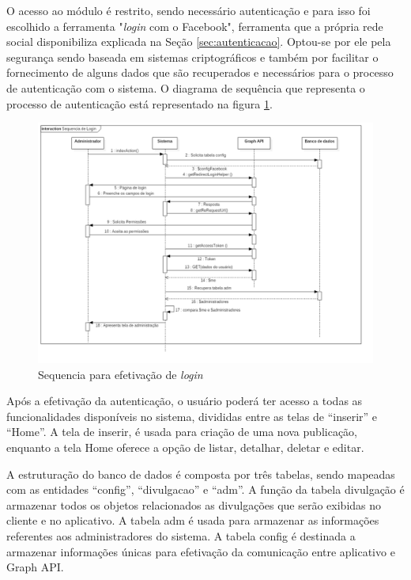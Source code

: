 O acesso ao módulo é restrito, sendo necessário autenticação e para isso foi escolhido a ferramenta "\textit{login} com o Facebook", ferramenta que a própria rede social disponibiliza explicada na Seção \ref{sec:autenticacao}. Optou-se por ele pela segurança sendo baseada em sistemas criptográficos e também por facilitar o fornecimento de alguns dados que são recuperados e necessários para o processo de autenticação com o sistema. O diagrama de sequência que representa o processo de autenticação está representado na figura \ref{fig:sequencialogin}.

\begin{figure}[H]
\centering
\includegraphics[scale=0.4]{figuras/sequencialogin}
\caption{Sequencia para efetivação de \textit{login}}
\label{fig:sequencialogin}
\end{figure}

Após a efetivação da autenticação, o usuário poderá ter acesso a todas as funcionalidades disponíveis no sistema, divididas entre as telas de ``inserir'' e ``Home''. A tela de inserir, é usada para criação de uma nova publicação, enquanto a tela Home oferece a opção de listar, detalhar, deletar e editar.

A estruturação do banco de dados é composta por três tabelas, sendo mapeadas com as entidades ``config'', ``divulgacao'' e ``adm''. A função da tabela divulgação é armazenar todos os objetos relacionados as divulgações que serão exibidas no cliente e no aplicativo. A tabela adm é usada para armazenar as informações referentes aos administradores do sistema. A tabela config é destinada a armazenar informações únicas para efetivação da comunicação entre aplicativo e Graph API.

